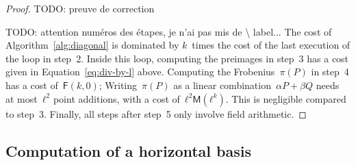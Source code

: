 \documentclass{lms}
\newcommand{\todo}[1]{{\color{red}TODO: #1}}
\begin{document}
\begin{proof}
\todo{preuve de correction}

\todo{attention numéros des étapes, je n'ai pas mis de \textbackslash
label...}
The cost of Algorithm~\ref{alg:diagonal} is dominated
by $k$~times the cost of the last execution of the loop in step~2.
Inside this loop, computing the preimages in step~3 has a cost given in
Equation~\ref{eq:div-by-l} above.
Computing the Frobenius~$π(P)$ in step~4 has a cost of~$\mathsf{F}(k, 0)$;
Writing~$π(P)$ as a linear combination~$α P + β Q$
needs at most~$ℓ^2$ point additions, with a cost of~$ℓ^2 \mathsf{M}(ℓ^k)$.
This is %
negligible compared to step~3.
Finally, all steps after step~5 only involve field arithmetic.

% 
\end{proof}

\subsection{Computation of a horizontal basis}
\label{ss:horizontal}
\end{document}
